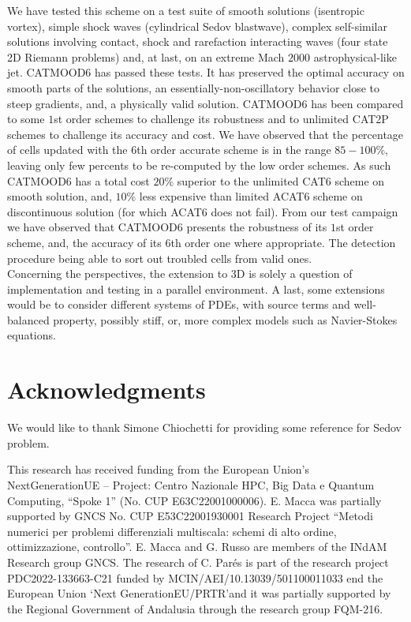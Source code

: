 \documentclass[3p,times]{elsarticle}
\begin{document}
We have tested this scheme on a test suite of smooth solutions (isentropic vortex), simple shock waves (cylindrical Sedov blastwave), complex self-similar solutions involving contact, shock and rarefaction interacting waves  (four state 2D Riemann problems) and, at last, on an extreme Mach $2000$ astrophysical-like jet.
CATMOOD6 has passed these tests. It has preserved the optimal accuracy on smooth parts of the solutions, an essentially-non-oscillatory behavior close to steep gradients, and, a physically valid solution. CATMOOD6 has been compared to  some $1$st order schemes to challenge its robustness and to unlimited CAT2P schemes to challenge its accuracy and cost.
We have observed that the percentage of cells updated with the 6th order accurate scheme is in the range $85-100\%$, leaving only few percents to be re-computed by the low order schemes. 
As such CATMOOD6 has a total cost $20\%$ superior to the unlimited CAT6 scheme on smooth solution, and, $10\%$ less expensive than limited ACAT6 scheme on discontinuous solution (for which ACAT6 does not fail).
From our test campaign we have observed that CATMOOD6 presents the robustness of its $1$st order scheme, and, the accuracy of its $6$th order one where appropriate. The detection procedure being able to sort out troubled cells from valid ones. \\
Concerning the perspectives, 
the extension to 3D is solely a question of implementation and testing in a parallel environment. 
A last, some extensions would be to consider different systems of PDEs, with source terms and well-balanced property, possibly stiff, or, more complex models such as Navier-Stokes equations.


\section*{Acknowledgments}
We would like to thank Simone Chiochetti for providing some reference for Sedov problem.

This research has received funding from the European Union’s NextGenerationUE – Project: Centro Nazionale HPC, Big Data e Quantum Computing, “Spoke 1” (No. CUP E63C22001000006). E. Macca was partially supported by GNCS No. CUP E53C22001930001 Research Project “Metodi numerici per problemi differenziali multiscala: schemi di alto ordine, ottimizzazione, controllo”. E. Macca and G. Russo are members of the INdAM Research group GNCS. The  research  of C. Parés  is part of the research project PDC2022-133663-C21 funded by MCIN/AEI/10.13039/501100011033 end the European Union \lq Next GenerationEU/PRTR\rq and it was  partially  supported  by  the Regional Government of Andalusia through the research group FQM-216.
\end{document}
